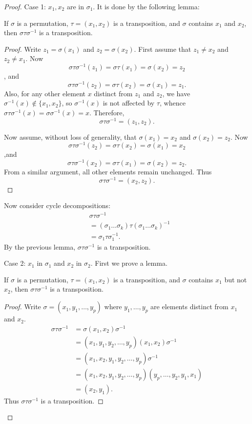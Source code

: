 \begin{enumerate}[resume]
\begin{proof}
	Case 1: $x_1,x_2$ are in $\sigma_1$. It is done by the following lemma:
\begin{lemma}
	If $\sigma$ is a permutation, $\tau = (x_1,x_2)$ is a transposition, and  $\sigma$ contains $x_1$ and $x_2$, then $\sigma \tau \sigma^{-1} $ is a transposition.
	\begin{proof}
	Write $z_1 = \sigma(x_1)$ and $z_2 = \sigma(x_2)$. First assume that $z_1\neq x_2$ and $z_2 \neq x_1$. Now 
	\[
		\sigma\tau\sigma^{-1}(z_1) = \sigma\tau(x_1) = \sigma(x_2) = z_2
	\] 
	, and \[
		\sigma\tau\sigma^{-1} (z_2) = \sigma\tau(x_2) = \sigma(x_1) = z_1
	.\] 
	Also, for any other element $x$ distinct from $z_1$ and $z_2$, we have $\sigma^{-1} (x) \not\in \{x_1,x_2\} $, so $\sigma^{-1} (x)$ is not affected by $\tau$, whence $\sigma\tau\sigma^{-1} (x) = \sigma\sigma^{-1} (x) = x$. Therefore, \[
		\sigma\tau\sigma^{-1} = (z_1,z_2)
	.\] 

	Now assume, without loss of generality, that $\sigma(x_1) = x_2$ and $\sigma(x_2) = z_2$. Now
	\[
		\sigma\tau\sigma^{-1} (z_2) = \sigma\tau(x_2) = \sigma(x_1) = x_2
	\] 
	,and \[
		\sigma\tau\sigma^{-1} (x_2) = \sigma\tau(x_1) = \sigma(x_2) = z_2
	.\] 
	From a similar argument, all other elements remain unchanged. Thus \[
		\sigma\tau\sigma^{-1}  = (x_2,z_2)
	.\] 
\end{proof}

\end{lemma}
Now consider cycle decompositions:
\begin{align*}
		&\sigma \tau \sigma^{-1}\\
		&= (\sigma_1 \ldots\sigma_k) \tau \left( \sigma_1\ldots\sigma_k \right) ^{-1} \\
		&= \sigma_1\tau\sigma_1^{-1}	
	.\end{align*}
	By the previous lemma, $\sigma\tau\sigma^{-1} $ is a transposition.

	Case 2: $x_1$ in $\sigma_1$ and $x_2$ in $\sigma_2$.
	First we prove a lemma.
	\begin{lemma}
	If $\sigma$ is a permutation, $\tau = (x_1,x_2)$ is a transposition, and  $\sigma$ contains $x_1$ but not $x_2$, then $\sigma \tau \sigma^{-1} $ is a transposition.
	\begin{proof}
	Write $\sigma = (x_1,y_1,\ldots,y_p)$ where $y_1,\ldots,y_p$ are elements distinct from $x_1$ and $x_2$.
	\begin{align*}
		\sigma\tau\sigma^{-1} 
		&=\sigma(x_1,x_2)\sigma^{-1}\\
		&=(x_1,y_1,y_2,\ldots,y_p)(x_1,x_2)\sigma^{-1}\\
		&=(x_1,x_2,y_1,y_2,\ldots,y_p)\sigma^{-1}\\
		&=(x_1,x_2,y_1,y_2,\ldots,y_p)(y_p, \ldots,y_2,y_1,x_1)\\
		&=(x_2,y_1)
	.\end{align*}
	Thus $\sigma\tau\sigma^{-1}$ is a transposition.
\end{proof}


\end{lemma}
\end{proof}
\end{enumerate}
